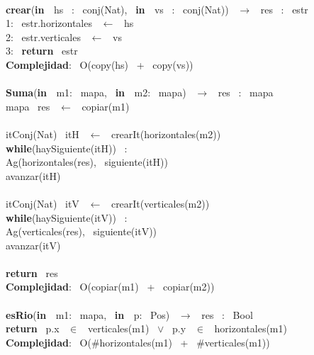 \begin{Algoritmos}
    \\
    \noindent \noindent\makebox[\linewidth]{\rule{\textwidth}{0.4pt}}
    \textbf{crear}(\textbf{in \ }hs \ : \ conj(Nat), \ \textbf{in \ }vs \ : \ conj(Nat)) \ $\longrightarrow$ \ res \ : \ estr\\
    1: \ estr.horizontales \ $\leftarrow$ \ hs\\
    2: \ estr.verticales \ $\leftarrow$ \ vs \ \\
    3: \ \textbf{return} \ estr\\
    \textbf{Complejidad}: \ O(copy(hs) \ + \ copy(vs))\\
    \noindent\makebox[\linewidth]{\rule{\textwidth}{0.4pt}}
    \\
    \noindent\makebox[\linewidth]{\rule{\textwidth}{0.4pt}}
    \textbf{Suma}(\textbf{in \ }m1: \ mapa, \ \textbf{in \ }m2: \ mapa) \ $\longrightarrow$ \ res \ : \ mapa\\
    \indent mapa \ res \ $\leftarrow$ \ copiar(m1)\\
    \\
    \indent itConj(Nat) \ itH \ $\leftarrow$ \ crearIt(horizontales(m2))\\
    \indent \textbf{while}(haySiguiente(itH)) \ :\\
    \indent \indent Ag(horizontales(res), \ siguiente(itH))\\
    \indent \indent avanzar(itH)\\
    \\
    \indent itConj(Nat) \ itV \ $\leftarrow$ \ crearIt(verticales(m2))\\
    \indent \textbf{while}(haySiguiente(itV)) \ :\\
    \indent \indent Ag(verticales(res), \ siguiente(itV))\\
    \indent \indent avanzar(itV)\\
    \\
    \indent \textbf{return} \ res\\
    \textbf{Complejidad}: \ O(copiar(m1) \ + \ copiar(m2))\\
    \noindent\makebox[\linewidth]{\rule{\textwidth}{0.4pt}}
    \\
    \noindent\makebox[\linewidth]{\rule{\textwidth}{0.4pt}}
    \textbf{esRio}(\textbf{in \ }m1: \ mapa, \ \textbf{in \ }p: \ Pos) \ $\longrightarrow$ \ res \ : \ Bool\\
    \indent \textbf{return} \ p.x \ $\in$ \ verticales(m1) \ $\vee$ \ p.y \ $\in$ \ horizontales(m1)\\
    \textbf{Complejidad}: \ O($ \# $horizontales(m1) \ + \ $ \# $verticales(m1))\\
    \noindent\makebox[\linewidth]{\rule{\textwidth}{0.4pt}}    
\end{Algoritmos}
